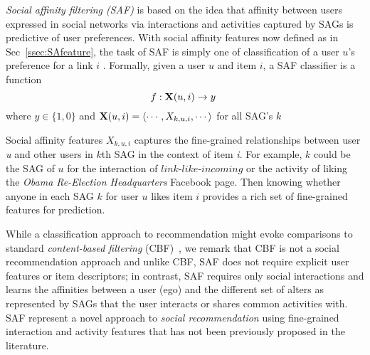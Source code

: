 
\emph{Social affinity filtering (SAF)} is based on the idea that
affinity between users expressed in social networks via interactions
and activities captured by SAGs is predictive of user preferences.
With social affinity features now defined as in Sec~\ref{ssec:SAfeature}, the task of SAF is
simply one of classification of a user $u$'s preference for a link $i$
. 
Formally, given a user $u$ and item $i$, a SAF classifier is  a
function 
$$f: \x(u,i) \to y\ $$ where $ y \in \{1, 0\}$ and $\x(u,i) = \langle
\cdots,X_{k,u,i},\cdots \rangle$ for all SAG's $k$

Social affinity features $X_{k,u,i}$ captures the fine-grained relationships between user \textit{u}
and other users in $k$th SAG in the context of item \textit{i}.
For example, $k$ could be the SAG of $u$ for the interaction of $\textit{link-like-incoming}$ or the activity of
liking the {\em Obama Re-Election Headquarters} Facebook page.  Then knowing whether
anyone in each SAG $k$ for user $u$ likes item $i$ provides a rich set
of fine-grained features for prediction.

While a classification approach to recommendation might evoke comparisons to standard
\emph{content-based filtering} (CBF)~\cite{newsweeder}, we remark that
CBF is not a social recommendation approach and unlike CBF, SAF does
not require explicit user features or item descriptors; in contrast, SAF
requires only social interactions and learns the affinities between a
user (ego) and the different set of alters as represented by SAGs that
the user interacts or shares common activities with. SAF represent a novel 
approach to \emph{social recommendation} using fine-grained interaction and
activity features that has not been previously proposed in the literature.
 



